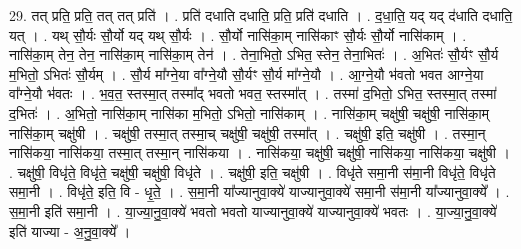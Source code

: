 \documentclass[17pt]{extarticle}
\begin{document}
29. तत् प्रति॒ प्रति॒ तत् तत् प्रति॑ । . प्रति॑ दधाति दधाति॒ प्रति॒ प्रति॑ दधाति । . द॒धा॒ति॒ यद् यद् द॑धाति दधाति॒ यत् । . यथ् सौ॒र्यः सौ॒र्यो यद् यथ् सौ॒र्यः । . सौ॒र्यो नासि॑का॒म् नासि॑काꣳ सौ॒र्यः सौ॒र्यो नासि॑काम् । . नासि॑का॒म् तेन॒ तेन॒ नासि॑का॒म् नासि॑का॒म् तेन॑ । . तेना॒भितो॒ ऽभित॒ स्तेन॒ तेना॒भितः॑ । . अ॒भितः॑ सौ॒र्यꣳ सौ॒र्य म॒भितो॒ ऽभितः॑ सौ॒र्यम् । . सौ॒र्य मा᳚ग्ने॒या वा᳚ग्ने॒यौ सौ॒र्यꣳ सौ॒र्य मा᳚ग्ने॒यौ । . आ॒ग्ने॒यौ भ॑वतो भवत आग्ने॒या वा᳚ग्ने॒यौ भ॑वतः । . भ॒व॒त॒ स्तस्मा॒त् तस्मा᳚द् भवतो भवत॒ स्तस्मा᳚त् । . तस्मा॑ द॒भितो॒ ऽभित॒ स्तस्मा॒त् तस्मा॑ द॒भितः॑ । . अ॒भितो॒ नासि॑का॒म् नासि॑का म॒भितो॒ ऽभितो॒ नासि॑काम् । . नासि॑का॒म् चक्षु॑षी॒ चक्षु॑षी॒ नासि॑का॒म् नासि॑का॒म् चक्षु॑षी । . चक्षु॑षी॒ तस्मा॒त् तस्मा॒च् चक्षु॑षी॒ चक्षु॑षी॒ तस्मा᳚त् । . चक्षु॑षी॒ इति॒ चक्षु॑षी । . तस्मा॒न् नासि॑कया॒ नासि॑कया॒ तस्मा॒त् तस्मा॒न् नासि॑कया । . नासि॑कया॒ चक्षु॑षी॒ चक्षु॑षी॒ नासि॑कया॒ नासि॑कया॒ चक्षु॑षी । . चक्षु॑षी॒ विधृ॑ते॒ विधृ॑ते॒ चक्षु॑षी॒ चक्षु॑षी॒ विधृ॑ते । . चक्षु॑षी॒ इति॒ चक्षु॑षी । . विधृ॑ते समा॒नी स॑मा॒नी विधृ॑ते॒ विधृ॑ते समा॒नी । . विधृ॑ते॒ इति॒ वि - धृ॒ते॒ । . स॒मा॒नी या᳚ज्यानुवा॒क्ये॑ याज्यानुवा॒क्ये॑ समा॒नी स॑मा॒नी या᳚ज्यानुवा॒क्ये᳚ । . स॒मा॒नी इति॑ समा॒नी । . या॒ज्या॒नु॒वा॒क्ये॑ भवतो भवतो याज्यानुवा॒क्ये॑ याज्यानुवा॒क्ये॑ भवतः । . या॒ज्या॒नु॒वा॒क्ये॑ इति॑ याज्या - अ॒नु॒वा॒क्ये᳚ । \newline
\end{document}
